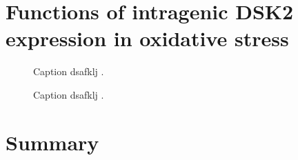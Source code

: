\section{Functions of intragenic DSK2 expression in oxidative stress}

\begin{figure}
\caption[A figure showing TSS-seq, TFIIB ChIP-nexus, and MNase-ChIP-seq at DSK2.]{Caption dsafklj .}
\end{figure}

\begin{figure}
\caption[A figure showing DSK2 fitness competition results.]{Caption dsafklj .}
\end{figure}


\section{Summary}

\newpage

\begingroup
\singlespacing

\endgroup

